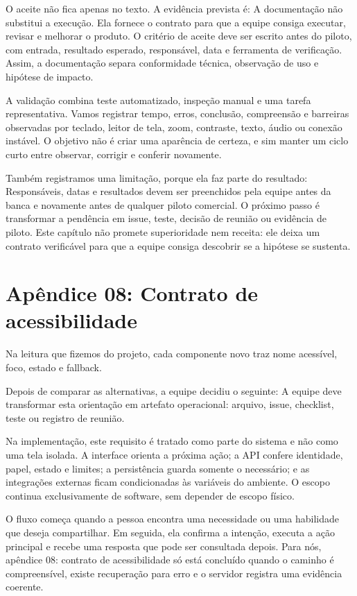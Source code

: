\documentclass[12pt,oneside,a4paper,article]{abntex2}
\begin{document}
O aceite não fica apenas no texto. A evidência prevista é: A documentação não substitui a execução. Ela fornece o contrato para que a equipe consiga executar, revisar e melhorar o produto. O critério de aceite deve ser escrito antes do piloto, com entrada, resultado esperado, responsável, data e ferramenta de verificação. Assim, a documentação separa conformidade técnica, observação de uso e hipótese de impacto.

A validação combina teste automatizado, inspeção manual e uma tarefa representativa. Vamos registrar tempo, erros, conclusão, compreensão e barreiras observadas por teclado, leitor de tela, zoom, contraste, texto, áudio ou conexão instável. O objetivo não é criar uma aparência de certeza, e sim manter um ciclo curto entre observar, corrigir e conferir novamente.

Também registramos uma limitação, porque ela faz parte do resultado: Responsáveis, datas e resultados devem ser preenchidos pela equipe antes da banca e novamente antes de qualquer piloto comercial. O próximo passo é transformar a pendência em issue, teste, decisão de reunião ou evidência de piloto. Este capítulo não promete superioridade nem receita: ele deixa um contrato verificável para que a equipe consiga descobrir se a hipótese se sustenta.

\section{Apêndice 08: Contrato de acessibilidade}
Na leitura que fizemos do projeto, cada componente novo traz nome acessível, foco, estado e fallback.

Depois de comparar as alternativas, a equipe decidiu o seguinte: A equipe deve transformar esta orientação em artefato operacional: arquivo, issue, checklist, teste ou registro de reunião.

Na implementação, este requisito é tratado como parte do sistema e não como uma tela isolada. A interface orienta a próxima ação; a API confere identidade, papel, estado e limites; a persistência guarda somente o necessário; e as integrações externas ficam condicionadas às variáveis do ambiente. O escopo continua exclusivamente de software, sem depender de escopo físico.

O fluxo começa quando a pessoa encontra uma necessidade ou uma habilidade que deseja compartilhar. Em seguida, ela confirma a intenção, executa a ação principal e recebe uma resposta que pode ser consultada depois. Para nós, apêndice 08: contrato de acessibilidade só está concluído quando o caminho é compreensível, existe recuperação para erro e o servidor registra uma evidência coerente.
\end{document}
